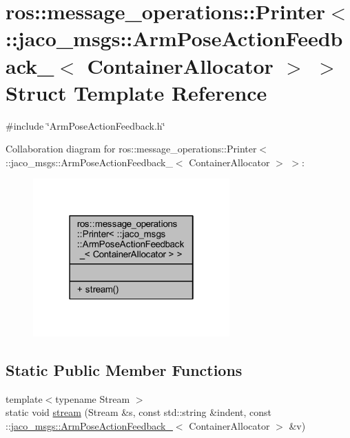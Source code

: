 \hypertarget{structros_1_1message__operations_1_1Printer_3_01_1_1jaco__msgs_1_1ArmPoseActionFeedback___3_01ContainerAllocator_01_4_01_4}{}\section{ros\+:\+:message\+\_\+operations\+:\+:Printer$<$ \+:\+:jaco\+\_\+msgs\+:\+:Arm\+Pose\+Action\+Feedback\+\_\+$<$ Container\+Allocator $>$ $>$ Struct Template Reference}
\label{structros_1_1message__operations_1_1Printer_3_01_1_1jaco__msgs_1_1ArmPoseActionFeedback___3_01ContainerAllocator_01_4_01_4}


{\ttfamily \#include \char`\"{}Arm\+Pose\+Action\+Feedback.\+h\char`\"{}}



Collaboration diagram for ros\+:\+:message\+\_\+operations\+:\+:Printer$<$ \+:\+:jaco\+\_\+msgs\+:\+:Arm\+Pose\+Action\+Feedback\+\_\+$<$ Container\+Allocator $>$ $>$\+:
\nopagebreak
\begin{figure}[H]
\begin{center}
\leavevmode
\includegraphics[width=214pt]{d4/d83/structros_1_1message__operations_1_1Printer_3_01_1_1jaco__msgs_1_1ArmPoseActionFeedback___3_01Co774c29b6ea8df26bd3913f2d2aaff7c6}
\end{center}
\end{figure}
\subsection*{Static Public Member Functions}
\begin{DoxyCompactItemize}
\item 
{\footnotesize template$<$typename Stream $>$ }\\static void \hyperlink{structros_1_1message__operations_1_1Printer_3_01_1_1jaco__msgs_1_1ArmPoseActionFeedback___3_01ContainerAllocator_01_4_01_4_a6195b98ad1b783b9c62f8a832901d203}{stream} (Stream \&s, const std\+::string \&indent, const \+::\hyperlink{structjaco__msgs_1_1ArmPoseActionFeedback__}{jaco\+\_\+msgs\+::\+Arm\+Pose\+Action\+Feedback\+\_\+}$<$ Container\+Allocator $>$ \&v)
\end{DoxyCompactItemize}


